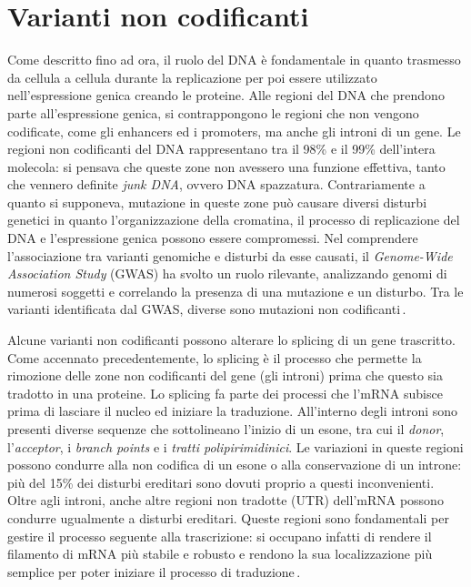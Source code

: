\section{Varianti non codificanti}

Come descritto fino ad ora, il ruolo del \acs{DNA} è fondamentale in quanto trasmesso da cellula a cellula durante la replicazione per poi essere utilizzato nell'espressione genica creando le proteine. Alle regioni del \acs{DNA} che prendono parte all'espressione genica, si contrappongono le regioni che non vengono codificate, come gli enhancers ed i promoters, ma anche gli introni di un gene. Le regioni non codificanti del \acs{DNA} rappresentano tra il 98\% e il 99\% dell'intera molecola: si pensava che queste zone non avessero una funzione effettiva, tanto che vennero definite \textit{junk \acs{DNA}}, ovvero \acs{DNA} spazzatura. Contrariamente a quanto si supponeva, mutazione in queste zone può causare diversi disturbi genetici in quanto l'organizzazione della cromatina, il processo di replicazione del \acs{DNA} e l'espressione genica possono essere compromessi. Nel comprendere l'associazione tra varianti genomiche e disturbi da esse causati, il \textit{Genome-Wide Association Study} (\acs{GWAS}) ha svolto un ruolo rilevante, analizzando genomi di numerosi soggetti e correlando la presenza di una mutazione e un disturbo. Tra le varianti identificata dal \acs{GWAS}, diverse sono mutazioni non codificanti\,\cite{visscher2012five, zhang2015non, ludwig2002functional}.

Alcune varianti non codificanti possono alterare lo splicing di un gene trascritto. Come accennato precedentemente, lo splicing è il processo che permette la rimozione delle zone non codificanti del gene (gli introni) prima che questo sia tradotto in una proteine. Lo splicing fa parte dei processi che l'\acs{mRNA} subisce prima di lasciare il nucleo ed iniziare la traduzione. All'interno degli introni sono presenti diverse sequenze che sottolineano l'inizio di un esone, tra cui il \textit{donor}, l'\textit{acceptor}, i \textit{branch points} e i \textsl{tratti polipirimidinici}. Le variazioni in queste regioni possono condurre alla non codifica di un esone o alla conservazione di un introne: più del 15\% dei disturbi ereditari sono dovuti proprio a questi inconvenienti. Oltre agli introni, anche altre regioni non tradotte (\acs{UTR}) dell'\acs{mRNA} possono condurre ugualmente a disturbi ereditari. Queste regioni sono fondamentali per gestire il processo seguente alla trascrizione: si occupano infatti di rendere il filamento di \acs{mRNA} più stabile e robusto e rendono la sua localizzazione più semplice per poter iniziare il processo di traduzione\,\cite{khurana2016role, french2020role}. 

